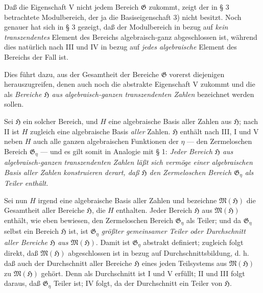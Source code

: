 Daß die Eigenschaft V nicht jedem Bereich $\mathfrak G$ zukommt, zeigt der in
§ 3 betrachtete Modulbereich, der ja die Basiseigenschaft 3) nicht besitzt. Noch
genauer hat sich in § 3 gezeigt, daß der Modulbereich in bezug auf \emph{kein
transzendentes} Element des Bereichs algebraisch-ganz abgeschlossen ist, während
dies natürlich nach III und IV in bezug auf \emph{jedes algebraische} Element des
Bereichs der Fall ist.

Dies führt dazu, aus der Gesamtheit der Bereiche $\mathfrak G$ vorerst
diejenigen herauszugreifen, denen auch noch die abstrakte Eigenschaft V zukommt
und die als \glqq{}\emph{Bereiche $\mathfrak H$ aus algebraisch-ganzen
transzendenten Zahlen}\grqq{} bezeichnet werden sollen.

Sei $\mathfrak H$ ein solcher Bereich, und $H$ eine algebraische Basis aller
Zahlen aus $\mathfrak H$; nach II ist $H$ zugleich eine algebraische Basis
\emph{aller} Zahlen. $\mathfrak H$ enthält nach III, I und V neben $H$ auch alle
ganzen algebraischen Funktionen der $\eta$ --- den Zermeloschen Bereich
$\mathfrak G_\eta$ --- und es gilt somit in Analogie mit § 1: \emph{Jeder
Bereich $\mathfrak H$ aus algebraisch-ganzen transzendenten Zahlen läßt sich
vermöge einer algebraischen Basis aller Zahlen konstruieren derart, daß
$\mathfrak H$ den Zermeloschen Bereich $\mathfrak G_\eta$ als Teiler enthält.}

Sei nun $H$ irgend eine algebraische Basis aller Zahlen und bezeichne
$\mathfrak M(\mathfrak H)$ die Gesamtheit aller Bereiche $\mathfrak H$, die $H$ enthalten.
Jeder Bereich $\mathfrak H$ aus $\mathfrak M(\mathfrak H)$ enthält, wie eben bewiesen, den
Zermeloschen Bereich $\mathfrak G_\eta$ als Teiler; und da $\mathfrak G_\eta$
selbst ein Bereich $\mathfrak H$ ist, ist $\mathfrak G_\eta$ \emph{größter
gemeinsamer Teiler oder Durchschnitt aller Bereiche $\mathfrak H$ aus
$\mathfrak M(\mathfrak H)$}. Damit ist $\mathfrak G_\eta$ abstrakt definiert; zugleich
folgt direkt, daß $\mathfrak M(\mathfrak H)$ abgeschlossen ist in bezug auf
Durchschnittsbildung, d. h. daß auch der Durchschnitt aller Bereiche
$\mathfrak H$ eines jeden Teilsystems aus $\mathfrak M(\mathfrak H)$ zu $\mathfrak M(\mathfrak H)$
gehört. Denn als Durchschnitt ist I und V erfüllt; II und III folgt daraus, daß
$\mathfrak G_\eta$ Teiler ist; IV folgt, da der Durchschnitt ein Teiler von
$\mathfrak H$.

